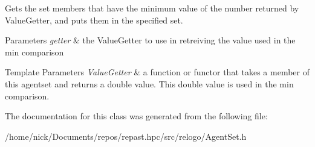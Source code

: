 Gets the set members that have the minimum value of the number returned by Value\-Getter, and puts them in the specified set. 


\begin{DoxyParams}{Parameters}
{\em getter} & the Value\-Getter to use in retreiving the value used in the min comparison\\
\hline
\end{DoxyParams}

\begin{DoxyTemplParams}{Template Parameters}
{\em Value\-Getter} & a function or functor that takes a member of this agentset and returns a double value. This double value is used in the min comparison. \\
\hline
\end{DoxyTemplParams}


The documentation for this class was generated from the following file\-:\begin{DoxyCompactItemize}
\item 
/home/nick/\-Documents/repos/repast.\-hpc/src/relogo/Agent\-Set.\-h\end{DoxyCompactItemize}
